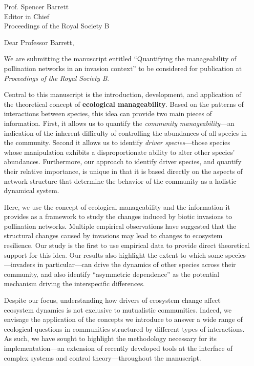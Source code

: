 \documentclass[12pt]{letter}
\begin{document}
\begin{letter}{
       Prof. Spencer Barrett\\
       Editor in Chief\\
       Proceedings of the Royal Society B}

\opening{Dear Professor Barrett,}

We are submitting the manuscript entitled ``Quantifying the manageability of pollination networks in an invasion context'' to be considered for publication at \emph{Proceedings of the Royal Society B}. 

Central to this manuscript is the introduction, development, and application of the theoretical concept of \textbf{ecological manageability}.
Based on the patterns of interactions between species, this idea can provide two main pieces of information. 
First, it allows us to quantify the \textit{community manageability}---an indication of the inherent difficulty of controlling the abundances of all species in the community. 
Second it allows us to identify \textit{driver species}---those species whose manipulation exhibits a disproportionate ability to alter other species' abundances. 
Furthermore, our approach to identify driver species, and quantify their relative importance, is unique in that it is based directly on the aspects of network structure that determine the behavior of the community as a holistic dynamical system. 

Here, we use the concept of ecological manageability and the information it provides as a framework to study the changes induced by biotic invasions to pollination networks. 
Multiple empirical observations have suggested that the structural changes caused by invasions may lead to changes to ecosystem resilience. 
Our study is the first to use empirical data to provide direct theoretical support for this idea. 
Our results also highlight the extent to which some species---invaders in particular---can drive the dynamics of other species across their community, and also identify ``asymmetric dependence'' as the potential mechanism driving the interspecific differences.

Despite our focus, understanding how drivers of ecosystem change affect ecosystem dynamics is not exclusive to mutualistic communities. 
Indeed, we envisage the application of the concepts we introduce to answer a wide range of ecological questions in communities structured by different types of interactions.
As such, we have sought to highlight the methodology necessary for its implementation---an extension of recently developed tools at the interface of complex systems and control theory---throughout the manuscript. 


\end{letter}
\end{document}
